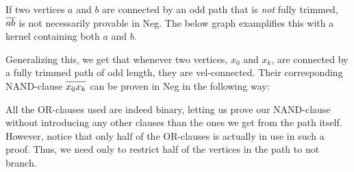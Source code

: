 If two vertices $a$ and $b$ are connected by an odd path that is \textit{not} fully trimmed, $\ol{ab}$ is not necessarily provable in Neg.
The below graph examplifies this with a kernel containing both $a$ and $b$.\par
\begin{figure}[!h]
  \centering
  \caption{}
  \label{fig:kernel_untrimmed}
\end{figure}
Generalizing this, we get that whenever two vertices, $x_0$ and $x_k$, are connected by a fully trimmed path of odd length, they are vel-connected.
Their corresponding NAND-clause $\ol{x_0x_k}$ can be proven in Neg in the following way:\par
\begin{figure}[!h]
  \centering
  \begin{prooftree*}
  \end{prooftree*}
\caption{}
\label{fig:proof_x0xk}
\end{figure}
\FloatBarrier
All the OR-clauses used are indeed binary, letting us prove our NAND-clause without introducing any other clauses than the ones we get from the path itself.
However, notice that only half of the OR-clauses is actually in use in such a proof.
Thus, we need only to restrict half of the vertices in the path to not branch.

